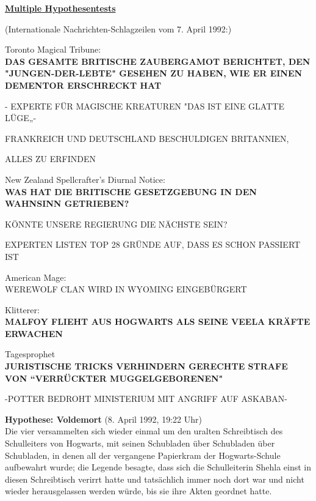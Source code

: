 

\hypertarget{multiple-hypothesentests}{%

\textbf{\uline{Multiple Hypothesentests}}

(Internationale Nachrichten-Schlagzeilen vom 7. April 1992:)

Toronto Magical Tribune:\\

\textbf{DAS GESAMTE BRITISCHE ZAUBERGAMOT BERICHTET, DEN "JUNGEN-DER-LEBTE" GESEHEN ZU HABEN, WIE ER EINEN DEMENTOR ERSCHRECKT HAT}

- EXPERTE FÜR MAGISCHE KREATUREN "DAS IST EINE GLATTE LÜGE„-

FRANKREICH UND DEUTSCHLAND BESCHULDIGEN BRITANNIEN,

ALLES ZU ERFINDEN

New Zealand Spellcrafter's Diurnal Notice:\\

\textbf{WAS HAT DIE BRITISCHE GESETZGEBUNG IN DEN WAHNSINN GETRIEBEN?}

KÖNNTE UNSERE REGIERUNG DIE NÄCHSTE SEIN?

EXPERTEN LISTEN TOP 28 GRÜNDE AUF, DASS ES SCHON PASSIERT IST

American Mage:\\

WEREWOLF CLAN WIRD IN WYOMING EINGEBÜRGERT

Klitterer:\\

\textbf{MALFOY FLIEHT AUS HOGWARTS ALS SEINE VEELA KRÄFTE ERWACHEN}

Tagesprophet\\

\textbf{JURISTISCHE TRICKS VERHINDERN GERECHTE STRAFE VON “VERRÜCKTER MUGGELGEBORENEN"}

-POTTER BEDROHT MINISTERIUM MIT ANGRIFF AUF ASKABAN-

\textbf{Hypothese: Voldemort} (8. April 1992, 19:22 Uhr)\\ Die vier versammelten sich wieder einmal um den uralten Schreibtisch des Schulleiters von Hogwarts, mit seinen Schubladen über Schubladen über Schubladen, in denen all der vergangene Papierkram der Hogwarts-Schule aufbewahrt wurde; die Legende besagte, dass sich die Schulleiterin Shehla einst in diesen Schreibtisch verirrt hatte und tatsächlich immer noch dort war und nicht wieder herausgelassen werden würde, bis sie ihre Akten geordnet hatte.

}
